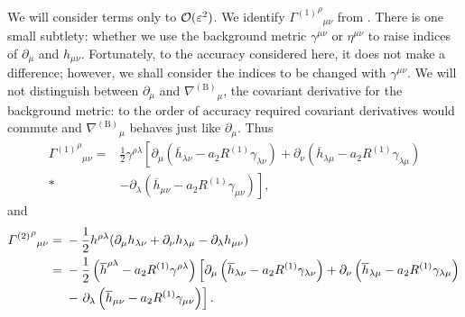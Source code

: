 We will consider terms only to $\mathcal{O}({\varepsilon^2})$. We identify ${{\Gamma^{(1)}}^\rho}_{\mu\nu}$ from . There is one small subtlety: whether we use the background metric $\gamma^{\mu\nu}$ or $\eta^{\mu\nu}$ to raise indices of $\partial_\mu$ and $h_{\mu\nu}$. Fortunately, to the accuracy considered here, it does not make a difference; however, we shall consider the indices to be changed with $\gamma^{\mu\nu}$. We will not distinguish between $\partial_\mu$ and ${\nabla^{(\text{B})}}_\mu$, the covariant derivative for the background metric: to the order of accuracy required covariant derivatives would commute and ${\nabla^{(\text{B})}}_\mu$ behaves just like $\partial_\mu$. Thus
\begin{align}
{{\Gamma^{(1)}}^\rho}_{\mu\nu} = {} & \frac{1}{2}\gamma^{\rho\lambda}\left[\partial_\mu \left(\overline{h}_{\lambda\nu} - a_2 R^{(1)}\gamma_{\lambda\nu}\right) + \partial_\nu \left(\overline{h}_{\lambda\mu} - a_2 R^{(1)}\gamma_{\lambda\mu}\right) \right. \nonumber \\*
 & - \left. \partial_\lambda \left(\overline{h}_{\mu\nu} - a_2 R^{(1)}\gamma_{\mu\nu}\right)\right] ,
\end{align}
and
\begin{align}
{{\Gamma^{(2)}}^\rho}_{\mu\nu} = {} & -\frac{1}{2}h^{\rho\lambda}(\partial_\mu h_{\lambda\nu} + \partial_\nu h_{\lambda\mu} - \partial_\lambda h_{\mu\nu}) \nonumber \\*
 = {} & -\frac{1}{2}\left(\overline{h}^{\rho\lambda} - a_2 R^{(1)}\gamma^{\rho\lambda}\right)\left[\partial_\mu \left(\overline{h}_{\lambda\nu} - a_2 R^{(1)}\gamma_{\lambda\nu}\right) + \partial_\nu \left(\overline{h}_{\lambda\mu} - a_2 R^{(1)}\gamma_{\lambda\mu}\right) \right. \nonumber \\*
 & - \left. \partial_\lambda \left(\overline{h}_{\mu\nu} \vphantom{R^{(1)}} - a_2 R^{(1)}\gamma_{\mu\nu}\right)\right].
\end{align}

